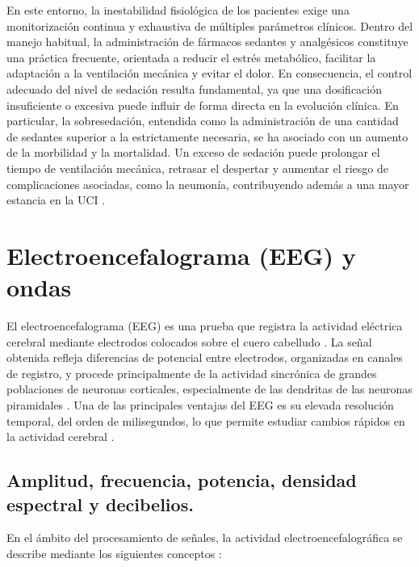 \documentclass[
  spanish,
  a4paper,
  12pt,
  twoside]{memoir}
\begin{document}
En este entorno, la inestabilidad fisiológica de los pacientes exige una
monitorización continua y exhaustiva de múltiples parámetros clínicos.
Dentro del manejo habitual, la administración de fármacos sedantes y
analgésicos constituye una práctica frecuente, orientada a reducir el
estrés metabólico, facilitar la adaptación a la ventilación mecánica y
evitar el dolor. En consecuencia, el control adecuado del nivel de
sedación resulta fundamental, ya que una dosificación insuficiente o
excesiva puede influir de forma directa en la evolución clínica. En
particular, la sobresedación, entendida como la administración de una
cantidad de sedantes superior a la estrictamente necesaria, se ha
asociado con un aumento de la morbilidad y la mortalidad. Un exceso de
sedación puede prolongar el tiempo de ventilación mecánica, retrasar el
despertar y aumentar el riesgo de complicaciones asociadas, como la
neumonía, contribuyendo además a una mayor estancia en la UCI
\citep{chamorro2008}.

\section{Electroencefalograma (EEG) y
ondas}\label{electroencefalograma-eeg-y-ondas}

El electroencefalograma (EEG) es una prueba que registra la actividad
eléctrica cerebral mediante electrodos colocados sobre el cuero
cabelludo \citep{medlineplusEEG}. La señal obtenida refleja diferencias
de potencial entre electrodos, organizadas en canales de registro, y
procede principalmente de la actividad sincrónica de grandes poblaciones
de neuronas corticales, especialmente de las dendritas de las neuronas
piramidales \citep{Louis2016A1}. Una de las principales ventajas del EEG
es su elevada resolución temporal, del orden de milisegundos, lo que
permite estudiar cambios rápidos en la actividad cerebral
\citep{Louis2016A2}.

\subsection{Amplitud, frecuencia, potencia, densidad espectral y
decibelios.}\label{amplitud-frecuencia-potencia-densidad-espectral-y-decibelios.}

En el ámbito del procesamiento de señales, la actividad
electroencefalográfica se describe mediante los siguientes conceptos
\citep{Kane2017}:
\end{document}
